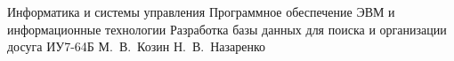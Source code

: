 \documentclass{bmstu}
\begin{document}
    \makecourseworktitle
    {Информатика и системы управления}
    {Программное обеспечение ЭВМ и информационные технологии}
    {Разработка базы данных для поиска и организации досуга}
    {ИУ7-64Б}
    {М.~В.~Козин}
    {Н.~В.~Назаренко}
    {}
    {}
\end{document}
